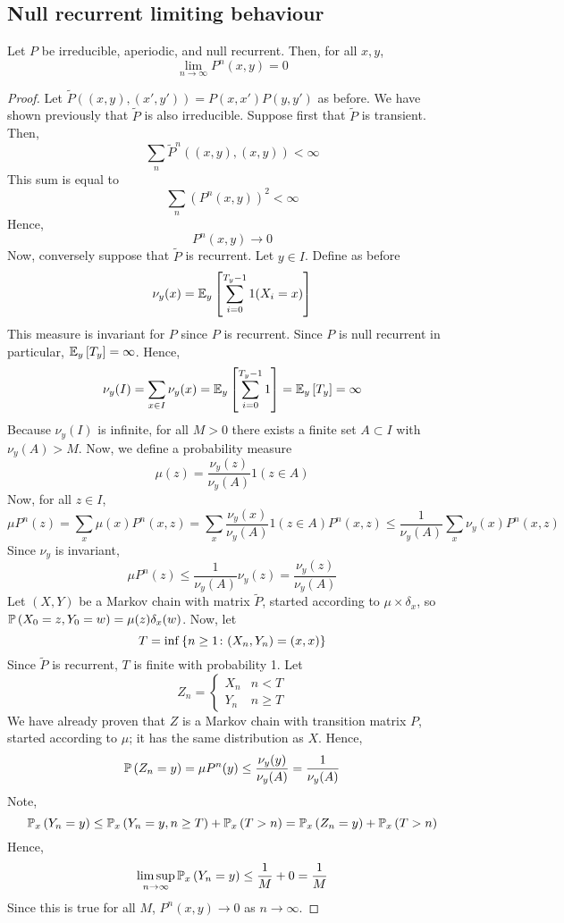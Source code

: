 \subsection{Null recurrent limiting behaviour}
\begin{theorem}
	Let \( P \) be irreducible, aperiodic, and null recurrent.
	Then, for all \( x, y \),
	\[
		\lim_{n \to \infty} P^n(x,y) = 0
	\]
\end{theorem}
\begin{proof}
	Let \( \widetilde P((x,y),(x',y')) = P(x,x')P(y,y') \) as before.
	We have shown previously that \( \widetilde P \) is also irreducible.
	Suppose first that \( \widetilde P \) is transient.
	Then,
	\[
		\sum_n \widetilde P^n((x,y),(x,y)) < \infty
	\]
	This sum is equal to
	\[
		\sum_n (P^n(x,y))^2 < \infty
	\]
	Hence,
	\[
		P^n(x,y) \to 0
	\]
	Now, conversely suppose that \( \widetilde P \) is recurrent.
	Let \( y \in I \).
	Define as before
	\[
		\nu_y(x) = \mathbb{E}_{y}\left[{\sum_{i=0}^{T_y - 1} 1(X_i = x)}\right]
	\]
	This measure is invariant for \( P \) since \( P \) is recurrent.
	Since \( P \) is null recurrent in particular, \( \mathbb{E}_{y}\left[{T_y}\right] = \infty \).
	Hence,
	\[
		\nu_y(I) = \sum_{x \in I} \nu_y(x) = \mathbb{E}_{y}\left[{\sum_{i=0}^{T_y - 1} 1}\right] = \mathbb{E}_{y}\left[{T_y}\right] = \infty
	\]
	Because \( \nu_y(I) \) is infinite, for all \( M > 0 \) there exists a finite set \( A \subset I \) with \( \nu_y(A) > M \).
	Now, we define a probability measure
	\[
		\mu(z) = \frac{\nu_y(z)}{\nu_y(A)} 1(z \in A)
	\]
	Now, for all \( z \in I \),
	\[
		\mu P^n(z) = \sum_x \mu(x) P^n(x,z) = \sum_x \frac{\nu_y(x)}{\nu_y(A)} 1(z \in A) P^n(x,z) \leq \frac{1}{\nu_y(A)} \sum_x \nu_y(x) P^n(x,z)
	\]
	Since \( \nu_y \) is invariant,
	\[
		\mu P^n(z) \leq \frac{1}{\nu_y(A)} \nu_y(z) = \frac{\nu_y(z)}{\nu_y(A)}
	\]
	Let \( (X, Y) \) be a Markov chain with matrix \( \widetilde P \), started according to \( \mu \times \delta_x \), so \( \mathbb{P}\left({X_0 = z, Y_0 = w}\right) = \mu(z) \delta_x(w) \).
	Now, let
	\[
		T = \inf\qty{n \geq 1 \colon (X_n, Y_n) = (x,x)}
	\]
	Since \( \widetilde P \) is recurrent, \( T \) is finite with probability 1.
	Let
	\[
		Z_n = \begin{cases}
			X_n & n < T    \\
			Y_n & n \geq T
		\end{cases}
	\]
	We have already proven that \( Z \) is a Markov chain with transition matrix \( P \), started according to \( \mu \); it has the same distribution as \( X \).
	Hence,
	\[
		\mathbb{P}\left({Z_n = y}\right) = \mu P^n(y) \leq \frac{\nu_y(y)}{\nu_y(A)} = \frac{1}{\nu_y(A)}
	\]
	Note,
	\[
		\mathbb{P}_{x}\left({Y_n = y}\right) \leq \mathbb{P}_{x}\left({Y_n = y, n \geq T}\right) + \mathbb{P}_{x}\left({T > n}\right) = \mathbb{P}_{x}\left({Z_n = y}\right) + \mathbb{P}_{x}\left({T > n}\right)
	\]
	Hence,
	\[
		\limsup_{n \to \infty} \mathbb{P}_{x}\left({Y_n = y}\right) \leq \frac{1}{M} + 0 = \frac{1}{M}
	\]
	Since this is true for all \( M \), \( P^n(x,y) \to 0 \) as \( n \to \infty \).
\end{proof}
